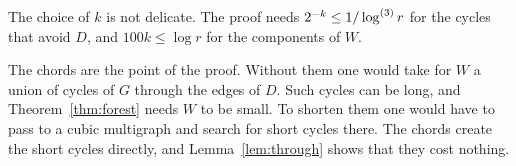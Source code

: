 \begin{remark}\label{rem:chords}
The choice of $k$ is not delicate. The proof needs $2^{-k}\le1/\log^{(3)}r$ for the cycles that avoid
$D$, and $100k\le\log r$ for the components of $W$.

The chords are the point of the proof. Without them one would take for $W$ a union of cycles of $G$
through the edges of $D$. Such cycles can be long, and Theorem~\ref{thm:forest} needs $W$ to be
small. To shorten them one would have to pass to a cubic multigraph and search for short cycles
there. The chords create the short cycles directly, and Lemma~\ref{lem:through} shows that they cost
nothing.
\end{remark}
